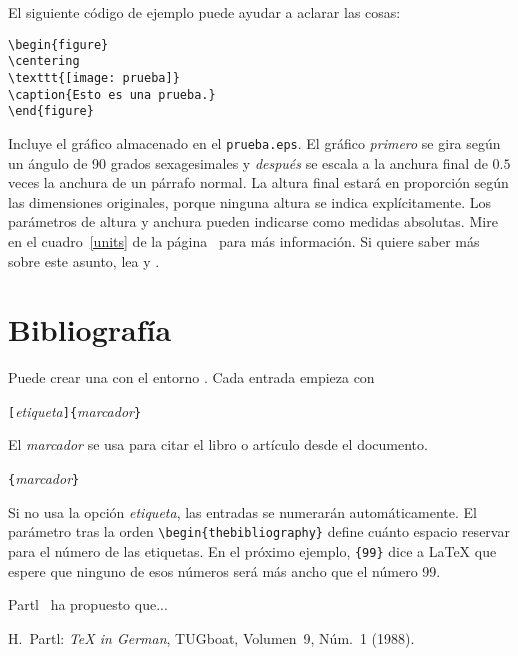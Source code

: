 \pagebreak

El siguiente código de ejemplo puede ayudar a aclarar las cosas:
\begin{code}
\begin{verbatim}
\begin{figure}
\centering
\texttt{[image: prueba]}
\caption{Esto es una prueba.}
\end{figure}
\end{verbatim}
\end{code}

Incluye el gráfico almacenado en el \filenomo{} \texttt{prueba.eps}. El gráfico \emph{primero} se gira según un ángulo de 90 grados sexagesimales y \emph{después} se escala a la anchura final de $0.5$ veces la anchura de un párrafo normal.  La altura final estará en proporción según las dimensiones originales, %
porque ninguna altura se indica explícitamente.  Los parámetros de altura y anchura pueden indicarse como medidas absolutas.  Mire en el cuadro~\ref{units} de la página~\pageref{units} para más información.  Si quiere saber más sobre este asunto, lea \cite{graphics} y \cite{eps}.

\section{Bibliografía}
 
Puede crear una  con el entorno .  Cada entrada empieza con
\begin{lscommand}
\verb|[|\emph{etiqueta}\verb|]{|\emph{marcador}\verb|}|
\end{lscommand}

El \emph{marcador} se usa para citar el libro o artículo desde el documento.
\begin{lscommand}
\verb|{|\emph{marcador}\verb|}|
\end{lscommand}

Si no usa la opción \emph{etiqueta}, las entradas se numerarán automáticamente.  El parámetro tras la orden \verb|\begin{thebibliography}| define cuánto espacio reservar para el número de las etiquetas.  En el próximo ejemplo, \verb|{99}| dice a \LaTeX{} que espere que ninguno de esos números será más ancho que el número 99.
\begin{example}
Partl~\cite{pa} ha
propuesto que...
\begin{thebibliography}{99}
 H.~Partl: 
\emph{\TeX{} in German},
TUGboat, Volumen~9, Núm.~1 (1988).
\end{thebibliography}
\end{example}

